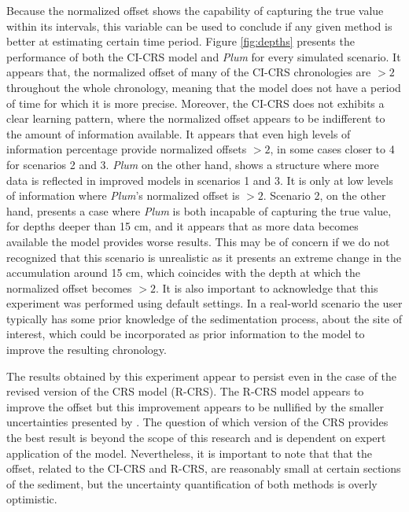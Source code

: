 \documentclass [10pt] {article}
\begin{document}
Because the normalized offset shows the capability of capturing the true value within its intervals, this variable can be used to conclude if any given method is better at estimating certain time period.
Figure \ref{fig:depths} presents the performance of both the CI-CRS model and \textit{Plum} for every simulated scenario.
It appears that, the normalized offset of many of the CI-CRS chronologies are $> 2$ throughout the whole chronology, meaning that the model does not have a period of time for which it is more precise. 
Moreover, the CI-CRS does not exhibits a clear learning pattern, where the normalized offset appears to be indifferent to the amount of information available.
It appears that even high levels of information percentage provide normalized offsets $> 2$, in some cases closer to 4 for scenarios 2 and 3.
\textit{Plum} on the other hand, shows a structure where more data is reflected in improved models in scenarios 1 and 3.
It is only at low levels of information where \textit{Plum}'s normalized offset is $>2$.
Scenario 2, on the other hand, presents a case where \textit{Plum} is both incapable of capturing the true value, for depths deeper than 15 cm, and it appears that as more data becomes available the model provides worse results. 
This may be of concern if we do not recognized that this scenario is unrealistic as it presents an extreme change in the accumulation around 15 cm, which coincides with the depth at which the normalized offset becomes $>2$.
It is also important to acknowledge that this experiment was performed using default settings.  
In a real-world scenario the user typically has some prior knowledge of the sedimentation process, about the site of interest, which could be incorporated as prior information to the model to improve the resulting chronology.

The results obtained by this experiment appear to persist even in the case of the revised version of the CRS model (R-CRS).
The R-CRS model appears to improve the offset but this improvement appears to be nullified by the smaller uncertainties presented by \citet{Sanchez-Cabeza2014}.
The question of which version of the CRS provides the best result is beyond the scope of this research and is dependent on expert application of the model.
Nevertheless, it is important to note that that the offset, related to the CI-CRS and R-CRS, are reasonably small at certain sections of the sediment, but the uncertainty quantification of both methods is overly optimistic.  
\end{document}
